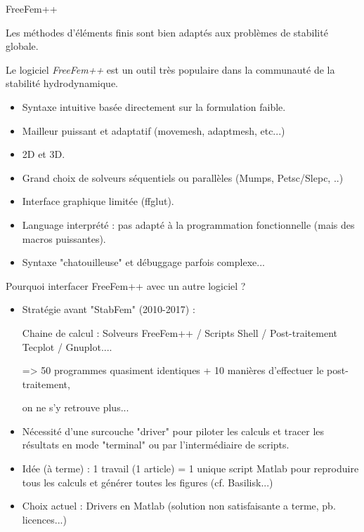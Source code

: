 \documentclass{beamer}
\newcommand{\ssp}{\vspace{.2cm} }
\begin{document}
\begin{frame}{FreeFem++}

Les méthodes d'éléments finis sont bien adaptés aux problèmes de stabilité globale.

Le logiciel {\em FreeFem++} est un outil très populaire dans la communauté de la stabilité hydrodynamique.

\small

\begin{itemize}[<+->]
\item
{\color{green} \Smiley{} \quad } Syntaxe intuitive basée directement sur la formulation faible.
\item
{\color{green} \Smiley{} \quad } Mailleur puissant et adaptatif (movemesh, adaptmesh, etc...)
\item
{\color{green} \Smiley{} \quad } 2D et 3D.
\item
{\color{green} \Smiley{} \quad } Grand choix de solveurs séquentiels ou parallèles (Mumps, Petsc/Slepc, ..)
\item
{\color{red} \Frowny{} \quad } Interface graphique limitée (ffglut).
\item
{\color{red} \Frowny{} \quad } Language interprété : pas adapté à la programmation fonctionnelle (mais des macros puissantes).
\item
{\color{red} \Frowny{} \quad } Syntaxe "chatouilleuse" et débuggage parfois complexe...
\end{itemize}
\end{frame}

\begin{frame}{Pourquoi interfacer FreeFem++ avec un autre logiciel ?}

\small

\begin{itemize}[<+->]

\item Stratégie avant "StabFem" (2010-2017) :

Chaine de calcul : Solveurs FreeFem++ / Scripts Shell / Post-traitement Tecplot / Gnuplot.... 

=> 50 programmes quasiment identiques + 10 manières d'effectuer le post-traitement,

on ne s'y retrouve plus... 

\ssp 

\item Nécessité d'une surcouche "driver"  pour piloter les calculs et tracer les résultats en mode "terminal" ou par l'intermédiaire de scripts.


\item Idée (à terme) : 1 travail (1 article) = 1 unique script Matlab pour reproduire tous les calculs et générer toutes les figures 
(cf. Basilisk...)


\item Choix actuel  : Drivers en Matlab (solution non satisfaisante a terme, pb. licences...)


\end{itemize}


\end{frame}
\end{document}
